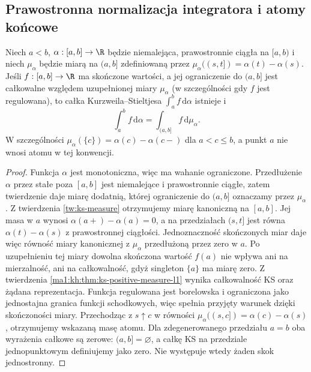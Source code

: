 \subsection{Prawostronna normalizacja integratora i atomy końcowe}
\begin{stwierdzenie}\label{st:ks-miara-konwencja}
Niech $a<b$, $\alpha:[a,b]\to\R$ będzie niemalejąca,
prawostronnie ciągła na $[a,b)$ i niech $\mu_\alpha$
będzie miarą na $(a,b]$ zdefiniowaną przez $\mu_\alpha((s,t])=\alpha(t)-\alpha(s)$. Jeśli $f:[a,b]\to\R$ ma skończone wartości, a jej
ograniczenie do $(a,b]$ jest całkowalne względem uzupełnionej
miary $\mu_\alpha$ (w szczególności gdy $f$ jest regulowana),
to całka Kurzweila--Stieltjesa $\int_a^b f\,\mathrm d\alpha$ istnieje i
\[
\int_a^b f\,\mathrm d\alpha=\int_{(a,b]}f\,\mathrm d\mu_\alpha.
\]
W szczególności $\mu_\alpha(\{c\})=\alpha(c)-\alpha(c-)$ dla $a<c\le b$, a punkt $a$ nie wnosi atomu w tej konwencji.
\end{stwierdzenie}
\begin{proof}
Funkcja $\alpha$ jest monotoniczna, więc ma wahanie ograniczone. Przedłużenie $\alpha$ przez stałe poza $[a,b]$ jest niemalejące i prawostronnie ciągłe, zatem twierdzenie  daje miarę dodatnią, której ograniczenie do $(a,b]$ oznaczamy przez $\mu_\alpha$. Z twierdzenia \ref{tw:ks-measure} otrzymujemy miarę
kanoniczną na $[a,b]$. Jej masa w $a$ wynosi $\alpha(a+)-\alpha(a)=0$, a na przedziałach $(s,t]$ jest równa $\alpha(t)-\alpha(s)$ z prawostronnej ciągłości. Jednoznaczność skończonych miar daje więc równość miary kanonicznej z $\mu_\alpha$ przedłużoną przez zero w $a$.
Po uzupełnieniu tej miary dowolna skończona wartość
$f(a)$ nie wpływa ani na mierzalność, ani na całkowalność,
gdyż singleton $\{a\}$ ma miarę zero. Z twierdzenia
\ref{ma1:kh:thm:ks-positive-measure-l1} wynika
całkowalność KS oraz żądana reprezentacja.
Funkcja regulowana jest borelowska i ograniczona
jako jednostajna granica funkcji schodkowych, więc
spełnia przyjęty warunek dzięki skończoności miary.
Przechodząc z $s\uparrow c$ w równości $\mu_\alpha((s,c])=\alpha(c)-\alpha(s)$, otrzymujemy wskazaną masę atomu.
Dla zdegenerowanego przedziału $a=b$ oba wyrażenia
całkowe są zerowe: $(a,b]=\varnothing$, a całkę KS
na przedziale jednopunktowym definiujemy jako zero.
Nie występuje wtedy żaden skok jednostronny.
\end{proof}
